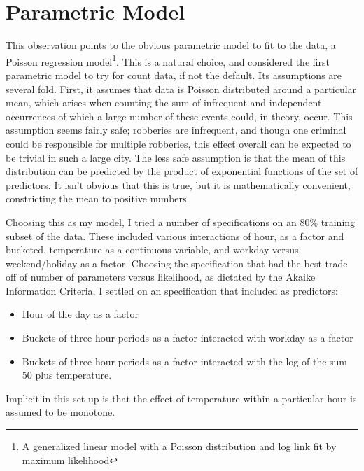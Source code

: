 \documentclass[11pt]{article}
\theoremstyle{definition}
\begin{document}
\section{Parametric Model} 
This observation points to the obvious parametric model to fit to the data, a Poisson regression model\footnote{A generalized linear model with a Poisson distribution and log link fit by maximum likelihood}. This is a natural choice, and  considered the first parametric model to try for count data, if not the default. Its assumptions are several fold. First, it assumes that data is Poisson distributed around a particular mean, which arises when counting the sum of infrequent and independent occurrences of which a large number of these events could, in theory, occur. This assumption seems fairly safe; robberies are infrequent, and though one criminal could be responsible for multiple robberies, this effect overall can be expected to be trivial in such a large city. The less safe assumption is that the mean of this distribution can be predicted by the product of exponential functions of the set of predictors. It isn't obvious that this is true, but it is mathematically convenient, constricting the mean to positive numbers. \par
Choosing this as my model, I tried a number of specifications on an $80\%$ training subset of the data. These included various interactions of hour, as a factor and bucketed, temperature as a continuous variable, and workday versus weekend/holiday as a factor. Choosing the specification that had the best trade off of number of parameters versus likelihood, as dictated by the Akaike Information Criteria, I settled on an specification that included as predictors:
\begin{itemize}
    \item Hour of the day as a factor 
    \item Buckets of three hour periods as a factor interacted with workday as a factor
    \item Buckets of three hour periods as a factor interacted with the log of the sum $50$ plus temperature.
\end{itemize}

\noindent Implicit in this set up is that the effect of temperature within a particular hour is assumed to be monotone. \par
\end{document}
